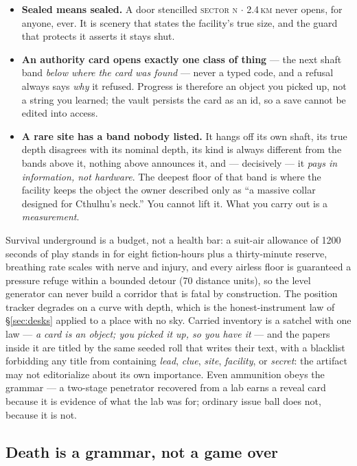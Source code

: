 \documentclass[10pt,twocolumn]{article}
\begin{document}
\begin{itemize}
  \item \textbf{Sealed means sealed.} A door stencilled \textsc{sector n $\cdot$ 2.4\,km}
        never opens, for anyone, ever. It is scenery that states the facility's true size,
        and the guard that protects it asserts it stays shut.
  \item \textbf{An authority card opens exactly one class of thing} --- the next shaft band
        \emph{below where the card was found} --- never a typed code, and a refusal always
        says \emph{why} it refused. Progress is therefore an object you picked up, not a
        string you learned; the vault persists the card as an id, so a save cannot be edited
        into access.
  \item \textbf{A rare site has a band nobody listed.} It hangs off its own shaft, its true
        depth disagrees with its nominal depth, its kind is always different from the bands
        above it, nothing above announces it, and --- decisively --- it \emph{pays in
        information, not hardware}. The deepest floor of that band is where the facility
        keeps the object the owner described only as ``a massive collar designed for
        Cthulhu's neck.'' You cannot lift it. What you carry out is a \emph{measurement}.
\end{itemize}

Survival underground is a budget, not a health bar: a suit-air allowance of 1200 seconds of
play stands in for eight fiction-hours plus a thirty-minute reserve, breathing rate scales
with nerve and injury, and every airless floor is guaranteed a pressure refuge within a
bounded detour (70 distance units), so the level generator can never build a corridor that
is fatal by construction. The position tracker degrades on a curve with depth, which is the
honest-instrument law of \S\ref{sec:desks} applied to a place with no sky. Carried inventory
is a satchel with one law --- \emph{a card is an object; you picked it up, so you have it}
--- and the papers inside it are titled by the same seeded roll that writes their text, with
a blacklist forbidding any title from containing \emph{lead}, \emph{clue}, \emph{site},
\emph{facility}, or \emph{secret}: the artifact may not editorialize about its own
importance. Even ammunition obeys the grammar --- a two-stage penetrator recovered from a
lab earns a reveal card because it is evidence of what the lab was for; ordinary issue ball
does not, because it is not.

\subsection{Death is a grammar, not a game over}
\label{sec:death}
\end{document}
